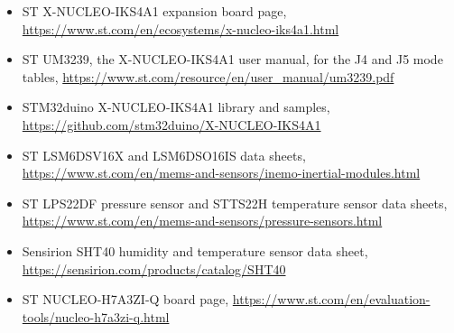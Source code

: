 \begin{itemize}
\item ST X-NUCLEO-IKS4A1 expansion board page,
\url{https://www.st.com/en/ecosystems/x-nucleo-iks4a1.html}
\item ST UM3239, the X-NUCLEO-IKS4A1 user manual, for the J4 and J5 mode tables,
\url{https://www.st.com/resource/en/user_manual/um3239.pdf}
\item STM32duino X-NUCLEO-IKS4A1 library and samples,
\url{https://github.com/stm32duino/X-NUCLEO-IKS4A1}
\item ST LSM6DSV16X and LSM6DSO16IS data sheets,
\url{https://www.st.com/en/mems-and-sensors/inemo-inertial-modules.html}
\item ST LPS22DF pressure sensor and STTS22H temperature sensor data sheets,
\url{https://www.st.com/en/mems-and-sensors/pressure-sensors.html}
\item Sensirion SHT40 humidity and temperature sensor data sheet,
\url{https://sensirion.com/products/catalog/SHT40}
\item ST NUCLEO-H7A3ZI-Q board page,
\url{https://www.st.com/en/evaluation-tools/nucleo-h7a3zi-q.html}
\end{itemize}
